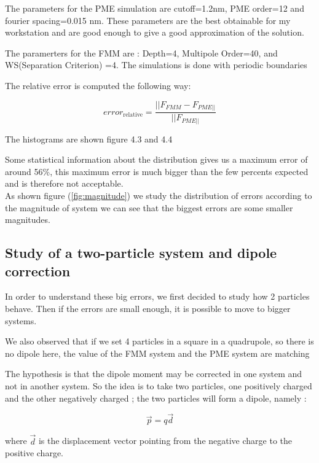 \documentclass[11pt,twoside,a4paper]{report}
\begin{document}
The parameters for the PME simulation are cutoff=1.2nm, PME order=12 and fourier spacing=0.015 nm. These parameters are the best obtainable for my workstation and are good enough to give a good approximation of the solution.

The paramerters for the FMM are : Depth=4, Multipole Order=40, and WS(Separation Criterion) =4. The simulations is done with periodic boundaries 

The relative error is computed the following way:

\begin{equation}
	error_{\text{relative}} = \frac{||F_{FMM} - F_{PME||}}{||F_{PME||}}
\end{equation}

The histograms are shown figure 4.3 and 4.4


	Some statistical information about the distribution gives us a maximum error of around 56\%, this maximum error is much bigger than the few percents expected and is therefore not acceptable.\\
	
	As shown figure (\ref{fig:magnitude}) we study the distribution of errors according to the magnitude of system we can see that the biggest errors are some smaller magnitudes.

\subsection{Study of a two-particle system and dipole correction}
	In order to understand these big errors, we first decided to study how 2 particles behave. Then if the errors are small enough, it is possible to move to bigger systems.
	
We also observed that if we set 4 particles in a square in a quadrupole, so there is no dipole here, the value of the FMM system and the PME system are matching




 	
	
The hypothesis is that the dipole moment may be corrected in one system and not in another system. So the idea is to take two particles, one positively charged and the other negatively charged ; the two particles will form a dipole, namely : 

\begin{equation}
	\vec{p} = q \vec{d}
\end{equation}	
	
	where $\vec{d}$ is the displacement vector pointing from the negative charge to the positive charge. 
	
\end{document}
